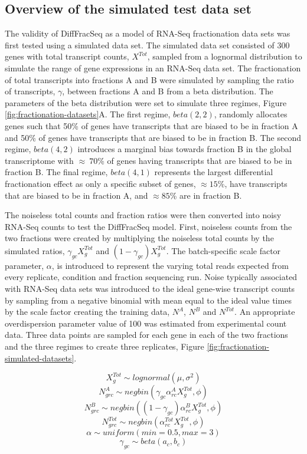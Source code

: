 \documentclass[../main.tex]{subfiles}
\begin{document}
\subsection{Overview of the simulated test data set}
The validity of DiffFracSeq as a model of RNA-Seq fractionation data sets was first tested using a simulated data set.
The simulated data set consisted of 300 genes with total transcript counts, $X^{Tot}$, sampled from a lognormal distribution to simulate the range of gene expressions in an RNA-Seq data set.
The fractionation of total transcripts into fractions A and B were simulated by sampling the ratio of transcripts, $\gamma$, between fractions A and B from a beta distribution.
The parameters of the beta distribution were set to simulate three regimes, Figure \ref{fig:fractionation-datasets}A.
The first regime, $beta(2,2)$, randomly allocates genes such that 50\% of genes have transcripts that are biased to be in fraction A and 50\% of genes have transcripts that are biased to be in fraction B.
The second regime, $beta(4,2)$ introduces a marginal bias towards fraction B in the global transcriptome with $\approx~70$\% of genes having transcripts that are biased to be in fraction B.
The final regime, $beta(4,1)$ represents the largest differential fractionation effect as only a specific subset of genes, $\approx15$\%, have transcripts that are biased to be in fraction A, and $\approx85$\% are in fraction B.

The noiseless total counts and fraction ratios were then converted into noisy RNA-Seq counts to test the DiffFracSeq model.
First, noiseless counts from the two fractions were created by multiplying the noiseless total counts by the simulated ratios, $\gamma_{gc}X^{Tot}_g$ and $(1-\gamma_{gc})X^{Tot}_g$. 
The batch-specific scale factor parameter, $\alpha$, is introduced to represent the varying total reads expected from every replicate, condition and fraction sequencing run.
Noise typically associated with RNA-Seq data sets was introduced to the ideal gene-wise transcript counts by sampling from a negative binomial with mean equal to the ideal value times by the scale factor creating the training data, $N^{A}$, $N^{B}$ and $N^{Tot}$.
An appropriate overdispersion parameter value of 100 was estimated from experimental count data.
Three data points are sampled for each gene in each of the two fractions and the three regimes to create three replicates, Figure \ref{fig:fractionation-simulated-datasets}.

$$X^{Tot}_g \sim lognormal(\mu, \sigma^2)$$
$$N^{A}_{grc} \sim negbin(\gamma_{gc}\alpha^{A}_{rc}X^{Tot}_g,\phi)$$
$$N^{B}_{grc} \sim negbin((1-\gamma_{gc})\alpha^{B}_{rc}X^{Tot}_g,\phi)$$
$$N^{Tot}_{grc} \sim negbin(\alpha^{Tot}_{rc}X^{Tot}_g,\phi)$$
$$\alpha \sim uniform(min=0.5, max=3)$$
$$\gamma_{gc}\sim beta(a_c,b_c)$$
\end{document}
